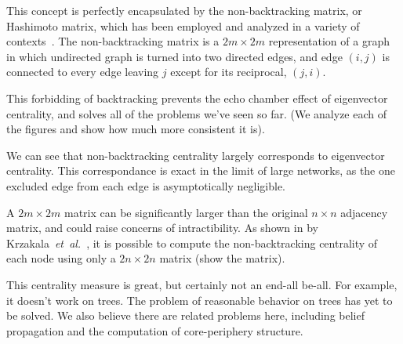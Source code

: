 \documentclass[twocolumn,prl,superscriptaddress]{revtex4}
\newcommand{\etal}{{\it{}et~al.}}
\begin{document}
This concept is perfectly encapsulated by the non-backtracking matrix, or Hashimoto matrix, which has been employed and analyzed in a variety of contexts~\cite{hashimoto89,angel07,krzakala13}. The non-backtracking matrix is a $2m \times 2m$ representation of a graph in which undirected graph is turned into two directed edges, and edge $(i,j)$ is connected to every edge leaving $j$ except for its reciprocal, $(j,i)$.

This forbidding of backtracking prevents the echo chamber effect of eigenvector centrality, and solves all of the problems we've seen so far. (We analyze each of the figures and show how much more consistent it is).

We can see that non-backtracking centrality largely corresponds to eigenvector centrality. This correspondance is exact in the limit of large networks, as the one excluded edge from each edge is asymptotically negligible.

A $2m \times 2m$ matrix can be significantly larger than the original $n \times n$ adjacency matrix, and could raise concerns of intractibility. As shown in by Krzakala~\etal~\cite{krzakala13}, it is possible to compute the non-backtracking centrality of each node using only a $2n \times 2n$ matrix (show the matrix).



This centrality measure is great, but certainly not an end-all be-all. For example, it doesn't work on trees. The problem of reasonable behavior on trees has yet to be solved. We also believe there are related problems here, including belief propagation and the computation of core-periphery structure.

\end{document}
